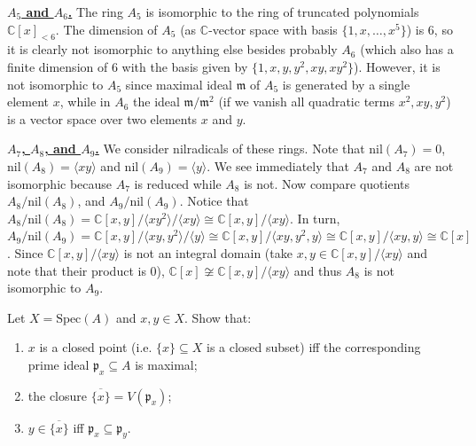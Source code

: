 \documentclass{template}
\begin{document}
\textcolor{blue!70!black}{\textbf{\underline{$A_5$ and $A_6$.}}} The ring $A_5$
is isomorphic to the ring of truncated polynomials $\mathbb{C}[x]_{<6}$. The
dimension of $A_5$ (as $\mathbb{C}$-vector space with basis $\{1,x,\dots,x^5\}$)
is $6$, so it is clearly not isomorphic to anything else besides probably $A_6$
(which also has a finite dimension of $6$ with the basis given by
$\{1,x,y,y^2,xy,xy^2\}$). However, it is not isomorphic to $A_5$ since maximal
ideal $\mathfrak{m}$ of $A_5$ is generated by a single element $x$, while in
$A_6$ the ideal $\mathfrak{m}/\mathfrak{m}^2$ (if we vanish all quadratic terms
$x^2,xy,y^2$) is a vector space over two elements $x$ and $y$.

\textcolor{blue!70!black}{\textbf{\underline{$A_7$, $A_8$, and $A_9$.}}} We
consider nilradicals of these rings. Note that $\text{nil}(A_7)=0$,
$\text{nil}(A_8) = \langle xy \rangle$ and $\text{nil}(A_9) = \langle y
\rangle$. We see immediately that $A_7$ and $A_8$ are not isomorphic because
$A_7$ is reduced while $A_8$ is not. Now compare quotients
$A_8/\text{nil}(A_8)$, and $A_9/\text{nil}(A_9)$. Notice that
$A_8/\text{nil}(A_8) = \mathbb{C}[x,y] / \langle xy^2 \rangle / \langle xy
\rangle \cong \mathbb{C}[x,y]/\langle xy \rangle$. In turn, $A_9/\text{nil}(A_9)
= \mathbb{C}[x,y]/ \langle xy, y^2 \rangle / \langle y \rangle \cong
\mathbb{C}[x,y]/\langle xy,y^2,y \rangle \cong \mathbb{C}[x,y]/\langle xy,y
\rangle \cong \mathbb{C}[x]$. Since $\mathbb{C}[x,y]/\langle xy \rangle$ is not
an integral domain (take $x,y \in \mathbb{C}[x,y]/\langle xy \rangle$ and note
that their product is $0$), $\mathbb{C}[x] \not\cong \mathbb{C}[x,y]/\langle xy
\rangle$ and thus $A_8$ is not isomorphic to $A_9$.

\begin{problem}[Exercise 2]
    Let $X = \text{Spec}(A)$ and $x,y \in X$. Show that:
    \begin{enumerate}
        \item[\textit{(a)}] $x$ is a closed point (i.e. $\{x\} \subseteq X$ is a
        closed subset) iff the corresponding prime ideal $\mathfrak{p}_x
        \subseteq A$ is maximal;
        \item[\textit{(b)}] the closure $\overline{\{x\}} = V(\mathfrak{p}_x)$;
        \item[\textit{(c)}] $y \in \overline{\{x\}}$ iff $\mathfrak{p}_x \subseteq \mathfrak{p}_y$.
    \end{enumerate}
\end{problem}
\end{document}
